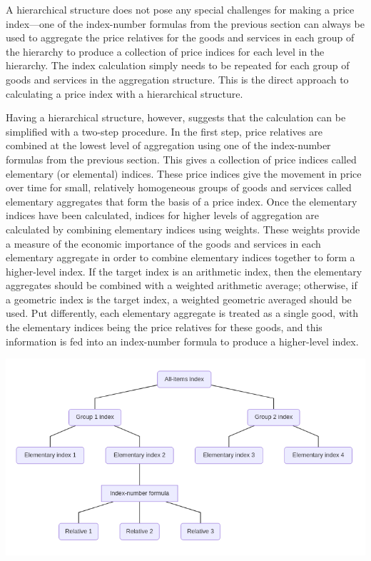 \documentclass[]{article}
\begin{document}
A hierarchical structure does not pose any special challenges for making a price index---one of the index-number formulas from the previous section can always be used to aggregate the price relatives for the goods and services in each group of the hierarchy to produce a collection of price indices for each level in the hierarchy. The index calculation simply needs to be repeated for each group of goods and services in the aggregation structure. This is the direct approach to calculating a price index with a hierarchical structure.

Having a hierarchical structure, however, suggests that the calculation can be simplified with a two-step procedure. In the first step, price relatives are combined at the lowest level of aggregation using one of the index-number formulas from the previous section. This gives a collection of price indices called elementary (or elemental) indices. These price indices give the movement in price over time for small, relatively homogeneous groups of goods and services called elementary aggregates that form the basis of a price index. Once the elementary indices have been calculated, indices for higher levels of aggregation are calculated by combining elementary indices using weights. These weights provide a measure of the economic importance of the goods and services in each elementary aggregate in order to combine elementary indices together to form a higher-level index. If the target index is an arithmetic index, then the elementary aggregates should be combined with a weighted arithmetic average; otherwise, if a geometric index is the target index, a weighted geometric averaged should be used. Put differently, each elementary aggregate is treated as a single good, with the elementary indices being the price relatives for these goods, and this information is fed into an index-number formula to produce a higher-level index.

\includegraphics{img/plot2.png}
\end{document}

